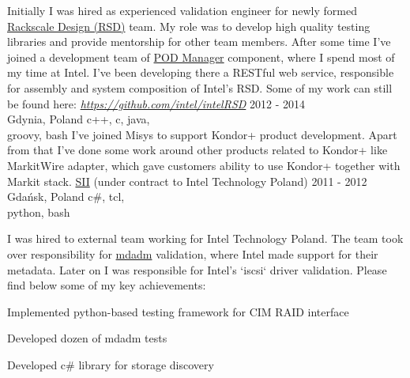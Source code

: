 \documentclass[a4paper,11pt]{cv4tw}%
\begin{document}
      {Initially I was hired as experienced validation engineer for newly formed
        \href{https://www.intel.com/intelRSD}{Rackscale Design (RSD)} team. My role was to develop high quality testing libraries and provide mentorship for
        other team members. After some time I've joined a development team of
        \href{https://www.intel.com/content/www/us/en/architecture-and-technology/rack-scale-design/pod-manager-user-guide-v2-1.html}{POD Manager} component,
        where I spend most of my time at Intel. I've been developing there a RESTful web service, responsible for assembly and system composition of Intel's RSD. 
        Some of my work can still be found here: \emph{\href{https://github.com/intel/intelRSD}{https://github.com/intel/intelRSD}}
      }
      {2012 - 2014\\Gdynia, Poland}
      {c++, c, java,\\groovy, bash}
      {I've joined Misys to support Kondor+ product development.
        Apart from that I've done some work around other products related to Kondor+
        like MarkitWire adapter, which gave customers ability to use Kondor+ together
        with Markit stack.
      }
      {\href{https://sii.pl/en/}{SII} (under contract to Intel Technology Poland)}
      {2011 - 2012\\Gdańsk, Poland}
      {c\#, tcl,\\python, bash}
      {I was hired to external team working for Intel Technology Poland. The team
        took over responsibility for \href{https://en.wikipedia.org/wiki/Mdadm}{mdadm}
        validation, where Intel made support for their metadata. Later on I was
        responsible for Intel's `iscsi` driver validation. Please find below some
        of my key achievements:
        \begin{missions}
        \item Implemented python-based testing framework for CIM RAID interface
        \item Developed dozen of mdadm tests
        \item Developed c\# library for storage discovery
        \end{missions}
      }
\end{document}
